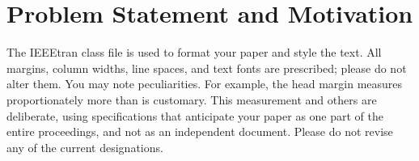 
\section{Problem Statement and Motivation} \label{sec:prob_motiv}

The IEEEtran class file is used to format your paper and style the text. All margins, column widths, line spaces, and text fonts are prescribed; please do not  alter them. You may note peculiarities. For example, the head margin
measures proportionately more than is customary. This measurement 
and others are deliberate, using specifications that anticipate your paper 
as one part of the entire proceedings, and not as an independent document. 
Please do not revise any of the current designations.
